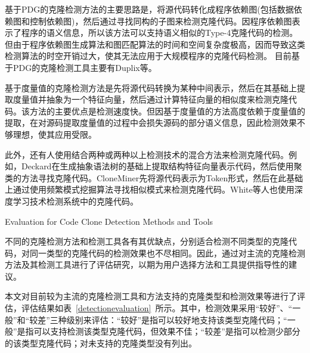 基于PDG的克隆检测方法的主要思路是，将源代码转化成程序依赖图(包括数据依赖图和控制依赖图)，然后通过寻找同构的子图来检测克隆代码。因程序依赖图表示了程序的语义信息，所以该方法可以支持语义相似的Type-4克隆代码的检测。但由于程序依赖图生成算法和图匹配算法的时间和空间复杂度极高，因而导致这类检测算法的时空开销过大，使其无法应用于大规模程序的克隆代码检测。
目前基于PDG的克隆检测工具主要有Duplix\cite{krinke2001identifying}等。

基于度量值的克隆检测方法是先将源代码转换为某种中间表示，然后在其基础上提取度量值并抽象为一个特征向量，然后通过计算特征向量的相似度来检测克隆代码。该方法的主要优点是检测速度快。但因基于度量值的方法高度依赖于度量值的提取，在对源码提取度量值的过程中会损失源码的部分语义信息，因此检测效果不够理想，使其应用受限。

此外，还有人使用结合两种或两种以上检测技术的混合方法来检测克隆代码。例如，Deckard在生成抽象语法树的基础上提取结构特征向量表示代码，然后使用聚类的方法寻找克隆代码\cite{jiang2007deckard}。CloneMiner先将源代码表示为Token形式，然后在此基础上通过使用频繁模式挖掘算法寻找相似模式来检测克隆代码\cite{basit2009data}。White等人也使用深度学习技术检测系统中的克隆代码\cite{white2016deep}。


{Evaluation for Code Clone Detection Methods and Tools}

不同的克隆检测方法和检测工具各有其优缺点，分别适合检测不同类型的克隆代码，对同一类型的克隆代码的检测效果也不尽相同。因此，通过对主流的克隆检测方法及其检测工具进行了评估研究，以期为用户选择方法和工具提供指导性的建议\cite{bellon2007comparison,rattan2013software,roy2009comparison,svajlenko2014evaluating}。%

本文对目前较为主流的克隆检测工具和方法支持的克隆类型和检测效果等进行了评估，评估结果如表~\ref{detectionevaluation}~所示。其中，检测效果采用“较好”、“一般”和“较差”三种级别来评估\cite{rattan2013software}：“较好”是指可以较好地支持该类型克隆代码；“一般”是指可以支持检测该类型克隆代码，但效果不佳；“较差”是指可以检测少部分的该类型克隆代码；对未支持的克隆类型没有列出。

